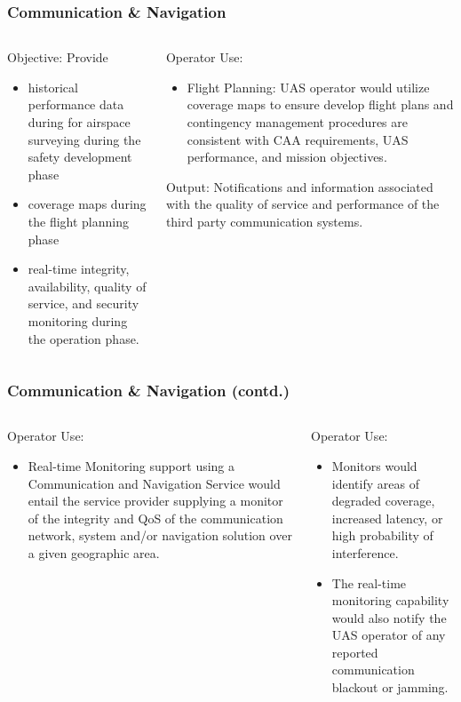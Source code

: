 \documentclass[usenames,dvipsnames,aspectratio=169,serif]{beamer}
\begin{document}
\begin{frame}
   \frametitle{Communication \& Navigation}
   \begin{columns}[t]
      \begin{column}{0.5\textwidth}
         Objective: Provide
         \begin{itemize}
            \item historical performance data during for airspace surveying during the safety development phase
            \item coverage maps during the flight planning phase
            \item real-time integrity, availability, quality of service, and security monitoring during the operation phase.
         \end{itemize}
      \end{column}
      \begin{column}{0.5\textwidth}
         Operator Use:
         \begin{itemize}
            \item  Flight Planning: UAS operator would utilize coverage maps to ensure develop flight plans and contingency management procedures are consistent with CAA requirements, UAS performance, and mission objectives.
         \end{itemize}
         Output: Notifications and information associated with the quality of service and performance of the third party communication systems. \\
      \end{column}
   \end{columns}
\end{frame}

\begin{frame}
   \frametitle{Communication \& Navigation (contd.)}
   \begin{columns}[t]
      \begin{column}{0.5\textwidth}
         Operator Use:
         \begin{itemize}
            \item  Real-time Monitoring support using a Communication and Navigation Service would entail the service provider supplying a monitor of the integrity and QoS of the communication network, system and/or navigation solution over a given geographic area.
         \end{itemize}
      \end{column}
      \begin{column}{0.5\textwidth}
         Operator Use:
         \begin{itemize}
            \item Monitors would identify areas of degraded coverage, increased latency, or high probability of interference.
            \item The real-time monitoring capability would also notify the UAS operator of any reported communication blackout or jamming.
         \end{itemize}
      \end{column}
   \end{columns}
\end{frame}
\end{document}
